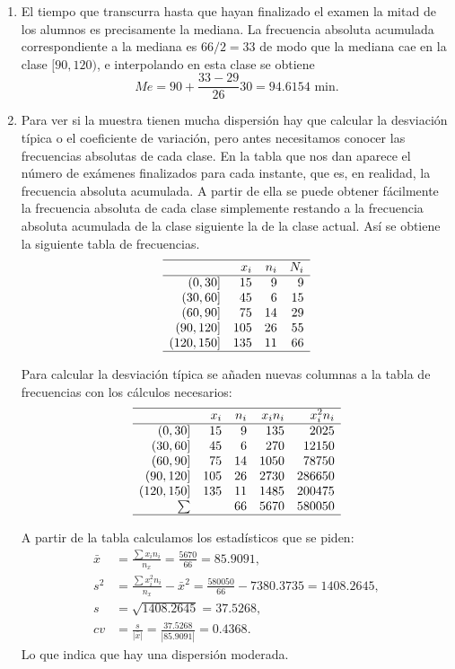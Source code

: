 {\begin{enumerate}
\item El tiempo que transcurra hasta que hayan finalizado el examen la mitad de los alumnos es precisamente la mediana.
La frecuencia absoluta acumulada correspondiente a la mediana es $66/2 = 33$ de modo que la mediana cae en la clase $[90,120)$, e interpolando en esta clase se obtiene
\[
Me = 90+\frac{33-29}{26}30 = 94.6154 \text{ min}.
\]
\item Para ver si la muestra tienen mucha dispersión hay que calcular la desviación típica o el coeficiente de variación, pero antes necesitamos
conocer las frecuencias absolutas de cada clase. En la tabla que nos dan aparece el número de exámenes finalizados para cada instante, que es,
en realidad, la frecuencia absoluta acumulada. A partir de ella se puede obtener fácilmente la frecuencia absoluta de cada clase simplemente
restando a la frecuencia absoluta acumulada de la clase siguiente la de la clase actual. Así se obtiene la siguiente tabla de frecuencias.
\[
\begin{array}{rrrr}
  \hline
 & x_i & n_i & N_i \\
  \hline
(0,30] & 15 & 9 & 9 \\
  (30,60] & 45 & 6 & 15 \\
  (60,90] & 75 & 14 & 29 \\
  (90,120] & 105 & 26 & 55 \\
  (120,150] & 135 & 11 & 66 \\
   \hline
\end{array}\]

Para calcular la desviación típica se añaden nuevas columnas a la tabla de frecuencias con los cálculos necesarios:
\[
\begin{array}{rrrrr}
  \hline
 & x_i & n_i & x_in_i & x_i^2n_i \\
  \hline
(0,30] & 15 & 9 & 135 & 2025 \\
  (30,60] & 45 & 6 & 270 & 12150 \\
  (60,90] & 75 & 14 & 1050 & 78750 \\
  (90,120] & 105 & 26 & 2730 & 286650 \\
  (120,150] & 135 & 11 & 1485 & 200475 \\
  \sum &  & 66 & 5670 & 580050 \\
   \hline
\end{array}\]

A partir de la tabla calculamos los estadísticos que se piden:
\begin{align*}
\bar x &= \frac{\sum x_in_i}{n_x} = \frac{5670}{66} = 85.9091,\\
s^2 & = \frac{\sum x_i^2n_i}{n_x}-\bar x^2 = \frac{580050}{66}-7380.3735 = 1408.2645,\\
s & = \sqrt{1408.2645} = 37.5268,\\
cv & = \frac{s}{|\bar x|} = \frac{37.5268}{|85.9091|} = 0.4368.
\end{align*}
Lo que indica que hay una dispersión moderada.
\end{enumerate}
}


